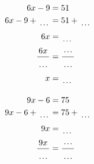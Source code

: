 \documentclass[12pt]{article}
\newcounter{minipagecount}
\begin{document}
\begin{multicols}{2}
\begin{minipage}[t]{0.45\textwidth}
    \raggedright %
    \begin{align*} %
        6x - 9 &= 51\\
        6x - 9 + \dotuline{\hspace{5mm}} &= 51 + \dotuline{\hspace{5mm}}\\
        6x &= \dotuline{\hspace{5mm}}\\
        \frac{6x}{\dotuline{\hspace{5mm}}} &= \frac{\dotuline{\hspace{5mm}}}{\dotuline{\hspace{5mm}}}\\
        x &= \dotuline{\hspace{5mm}}\\
    \end{align*}
\end{minipage} %
\noindent{(\theminipagecount)}\hspace{0.1mm} %
\begin{minipage}[t]{0.45\textwidth} %
    \vspace{-26pt}  %
    \raggedright %
    \begin{align*} %
        9x - 6 &= 75\\
        9x - 6 + \dotuline{\hspace{5mm}} &= 75 + \dotuline{\hspace{5mm}}\\
        9x &= \dotuline{\hspace{5mm}}\\
        \frac{9x}{\dotuline{\hspace{5mm}}} &= \frac{\dotuline{\hspace{5mm}}}{\dotuline{\hspace{5mm}}}\\

\end{align*}
\end{minipage}
\end{multicols}
\end{document}
